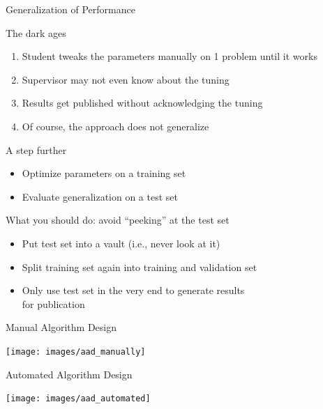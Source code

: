 \begin{frame}[c]{Generalization of Performance}

The dark ages
\begin{enumerate}
  \item Student tweaks the parameters manually on \alert{1} problem until it works
  \item Supervisor may not even know about the tuning
  \item Results get published without acknowledging the tuning
  \item Of course, the approach \alert{does not generalize}  
\end{enumerate}

\medskip
\pause

A step further
\begin{itemize}
  \item Optimize parameters on a \alert{training set} 
  \item Evaluate generalization on a \alert{test set} 
\end{itemize}

\medskip
\pause

What you should do: avoid ``\alert{peeking}'' at the test set
\begin{itemize}
  \item Put test set into a vault (i.e., never look at it)
  \item Split training set again into \alert{training} and \alert{validation} set
  \item Only use test set in the very end to generate results\\ for publication  
\end{itemize}

\end{frame}
\begin{frame}[c]{Manual Algorithm Design}

\centering
\texttt{[image: images/aad\_manually]}

\end{frame}
\begin{frame}[c]{Automated Algorithm Design}

\centering
\texttt{[image: images/aad\_automated]}

\end{frame}
